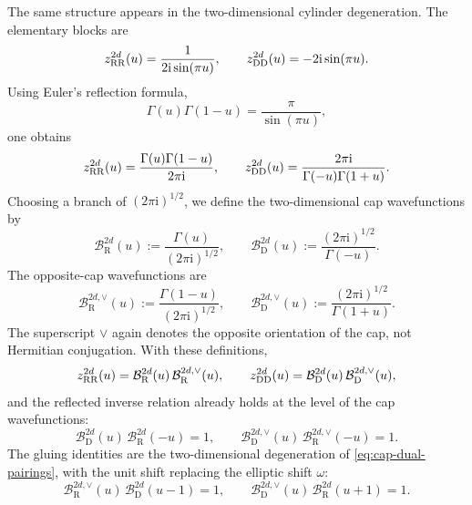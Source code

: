 \documentclass[11pt,a4paper]{article}
\numberwithin{equation}{section}
\theoremstyle{plain}
\theoremstyle{definition}
\theoremstyle{remark}
\newcommand{\ii}{\mathrm{i}}
\begin{document}
The same structure appears in the two-dimensional cylinder degeneration.  The elementary blocks are
\begin{equation}
z_{\rm RR}^{2d}(u)
=
\frac{1}{2\ii\sin(\pi u)},
\qquad
z_{\rm DD}^{2d}(u)
=
-2\ii\sin(\pi u).
\label{eq:2d-blocks-factorization-section}
\end{equation}
Using Euler's reflection formula,
\begin{equation}
\Gamma(u)\Gamma(1-u)
=
\frac{\pi}{\sin(\pi u)},
\label{eq:euler-reflection}
\end{equation}
one obtains
\begin{equation}
z_{\rm RR}^{2d}(u)
=
\frac{\Gamma(u)\Gamma(1-u)}{2\pi\ii},
\qquad
z_{\rm DD}^{2d}(u)
=
\frac{2\pi\ii}{\Gamma(-u)\Gamma(1+u)}.
\label{eq:2d-blocks-gamma-factorization}
\end{equation}
Choosing a branch of \((2\pi\ii)^{1/2}\), we define the two-dimensional cap wavefunctions by
\begin{equation}
\mathcal B_{\mathrm R}^{2d}(u)
:=
\frac{\Gamma(u)}{(2\pi\ii)^{1/2}},
\qquad
\mathcal B_{\mathrm D}^{2d}(u)
:=
\frac{(2\pi\ii)^{1/2}}{\Gamma(-u)}.
\label{eq:2d-cap-wavefunctions}
\end{equation}
The opposite-cap wavefunctions are
\begin{equation}
\mathcal B_{\mathrm R}^{2d,\vee}(u)
:=
\frac{\Gamma(1-u)}{(2\pi\ii)^{1/2}},
\qquad
\mathcal B_{\mathrm D}^{2d,\vee}(u)
:=
\frac{(2\pi\ii)^{1/2}}{\Gamma(1+u)}.
\label{eq:2d-opposite-cap-wavefunctions}
\end{equation}
The superscript \(\vee\) again denotes the opposite orientation of the cap, not Hermitian conjugation.  With these definitions,
\begin{equation}
z_{\rm RR}^{2d}(u)
=
\mathcal B_{\mathrm R}^{2d}(u)\,
\mathcal B_{\mathrm R}^{2d,\vee}(u),
\qquad
z_{\rm DD}^{2d}(u)
=
\mathcal B_{\mathrm D}^{2d}(u)\,
\mathcal B_{\mathrm D}^{2d,\vee}(u),
\label{eq:2d-block-factorization}
\end{equation}
and the reflected inverse relation already holds at the level of the cap wavefunctions:
\begin{equation}
\mathcal B_{\mathrm D}^{2d}(u)\,
\mathcal B_{\mathrm R}^{2d}(-u)=1,
\qquad
\mathcal B_{\mathrm D}^{2d,\vee}(u)\,
\mathcal B_{\mathrm R}^{2d,\vee}(-u)=1.
\label{eq:2d-cap-wavefunction-inverse}
\end{equation}
The gluing identities are the two-dimensional degeneration of \eqref{eq:cap-dual-pairings}, with the unit shift replacing the elliptic shift \(\omega\):
\begin{equation}
\mathcal B_{\mathrm R}^{2d,\vee}(u)\,
\mathcal B_{\mathrm D}^{2d}(u-1)=1,
\qquad
\mathcal B_{\mathrm D}^{2d,\vee}(u)\,
\mathcal B_{\mathrm R}^{2d}(u+1)=1.
\label{eq:2d-cap-dual-pairings}
\end{equation}
\end{document}
